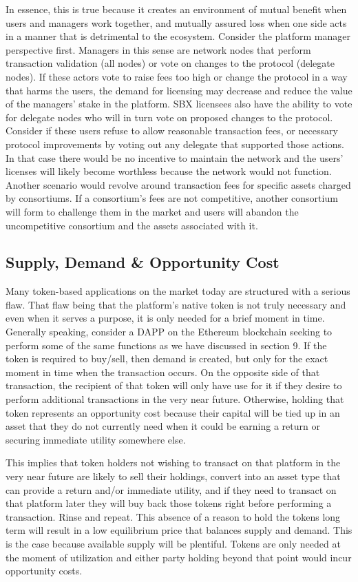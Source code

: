 \documentclass[12pt]{article}
\begin{document}
In essence, this is true because it creates an environment of mutual benefit when users and managers work together, 
and mutually assured loss when one side acts in a manner that is detrimental to the ecosystem. Consider the platform 
manager perspective first. Managers in this sense are network nodes that perform transaction validation (all nodes) or vote 
on changes to the protocol (delegate nodes). If these actors vote to raise fees too high or change the protocol in a way 
that harms the users, the demand for licensing may decrease and reduce the value of the managers’ stake in the platform. 
SBX licensees also have the ability to vote for delegate nodes who will in turn vote on proposed changes to the protocol. 
Consider if these users refuse to allow reasonable transaction fees, or necessary protocol improvements by voting out any 
delegate that supported those actions. In that case there would be no incentive to maintain the network and the users’ licenses 
will likely become worthless because the network would not function. Another scenario would revolve around transaction fees for specific 
assets charged by consortiums. If a consortium’s fees are not competitive, another consortium will form to challenge them in the 
market and users will abandon the uncompetitive consortium and the assets associated with it.

\subsection{Supply, Demand \& Opportunity Cost}

Many token-based applications on the market today are structured with a serious flaw. That flaw being that 
the platform’s native token is not truly necessary and even when it serves a purpose, it is only needed for 
a brief moment in time. Generally speaking, consider a DAPP on the Ethereum blockchain seeking to perform some of 
the same functions as we have discussed in section 9. If the token is required to buy/sell, then demand is created, 
but only for the exact moment in time when the transaction occurs. On the opposite side of that transaction, the 
recipient of that token will only have use for it if they desire to perform additional transactions in the very 
near future. Otherwise, holding that token represents an opportunity cost because their capital will be tied up 
in an asset that they do not currently need when it could be earning a return or securing immediate 
utility somewhere else. 

This implies that token holders not wishing to transact on that platform in the very near future are likely to 
sell their holdings, convert into an asset type that can provide a return and/or immediate utility, and if 
they need to transact on that platform later they will buy back those tokens right before performing a transaction. 
Rinse and repeat. This absence of a reason to hold the tokens long term will result in a low equilibrium price that 
balances supply and demand. This is the case because available supply will be plentiful. Tokens are only needed at 
the moment of utilization and either party holding beyond that point would incur opportunity costs.
\end{document}
